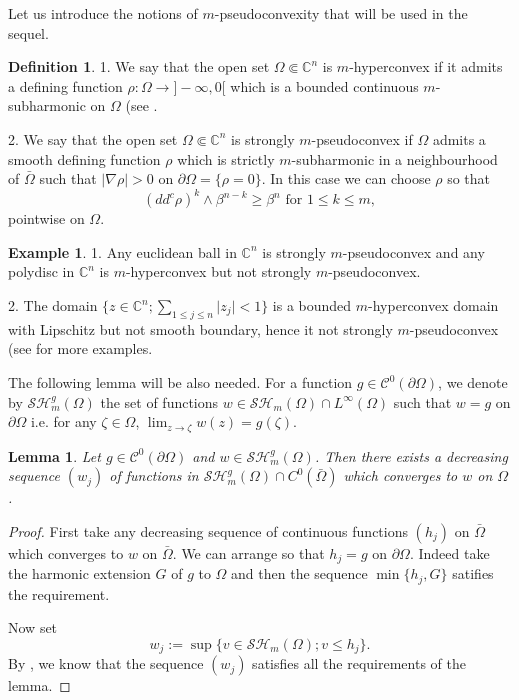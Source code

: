 \documentclass[12pt]{amsart}
\newtheorem{lemma}[theorem]{Lemma}
\theoremstyle{definition}
\newtheorem{definition}[theorem]{Definition}
\newtheorem{example}[theorem]{Example}
\numberwithin{theorem}{section}
\numberwithin{equation}{section}
\newcommand{\C}{\mathbb{C}}
\begin{document}
Let us introduce  the notions of $m$-pseudoconvexity that will be used in the sequel.

\begin{definition} 1.  We say that the open set $\Omega \Subset \C^n$  is  $m$-hyperconvex  if it admits a defining function $\rho : \Omega \longrightarrow ]-\infty , 0[$ which is a bounded continuous $m$-subharmonic on $\Omega$ (see \cite{Lu12,Lu15}. 

2. We say that the open set $\Omega \Subset \C^n$  is  strongly $m$-pseudoconvex if $\Omega$ admits a smooth defining function $\rho$ which is strictly $m$-subharmonic in a neighbourhood of $\bar \Omega$ such that  $\vert \nabla \rho\vert > 0$ on $\partial \Omega = \{\rho = 0\}$. In this case we can choose $\rho $ so that
\begin{equation} \label{eq:stronpconvexity}
(dd^c \rho)^k \wedge \beta^{n - k} \geq \beta^n \, \, \mathrm{for} \, \, 1 \leq k \leq m,
\end{equation}
pointwise on $\Omega$.
\end{definition}

 \begin{example}
1.  Any euclidean ball in $\C^n$ is strongly  $m$-pseudoconvex and any polydisc in $\C^n$ is $m$-hyperconvex but not strongly  $m$-pseudoconvex.

2. The domain $\{ z \in \C^n ; \sum_{1 \leq j \leq n} \vert z_j\vert < 1 \}$ is a bounded  $m$-hyperconvex domain with Lipschitz but not smooth boundary, hence it not strongly  $m$-pseudoconvex (see \cite{Ch16a} for more examples. 
\end{example}

The following lemma will be also needed. 
 For a function $g \in \mathcal{C}^0 (\partial \Omega)$, we denote by   $\mathcal{SH}^g_m (\Omega)$ the set of functions $w \in \mathcal{SH}_m (\Omega) \cap L^{\infty} (\Omega)$ such that $w =g$ on $\partial \Omega$ i.e.  for any $\zeta \in \Omega$, $\lim_{z \to \zeta} w (z) =  g (\zeta)$.
 
\begin{lemma} \label{lem:appximationwithbdv} Let $g \in \mathcal{C}^0 (\partial \Omega)$ and   $w \in \mathcal{SH}_m^g (\Omega)$. Then there exists a decreasing sequence $(w_j)$ of functions in $\mathcal{SH}_m^g  (\Omega) \cap C^0 (\bar{\Omega})$ which converges to $w$ on $\Omega$.
\end{lemma}
\begin{proof} First take any decreasing sequence  of continuous functions $(h_j)$ on $\bar{\Omega}$ which converges to $w$ on $\bar{\Omega}$. We can arrange so that $h_j = g$ on $\partial \Omega$. Indeed take the harmonic extension $G$ of $g$ to $\Omega$ and then the sequence $\min \{h_j,G\}$ satifies the requirement. 

Now  set
$$
w_j := \sup \{v \in \mathcal{SH}_m (\Omega) ; v \leq h_j\}.
$$ 
 By \cite{BZ20}, we know that the sequence $(w_j)$ satisfies all the requirements of the lemma.
\end{proof}
\end{document}

